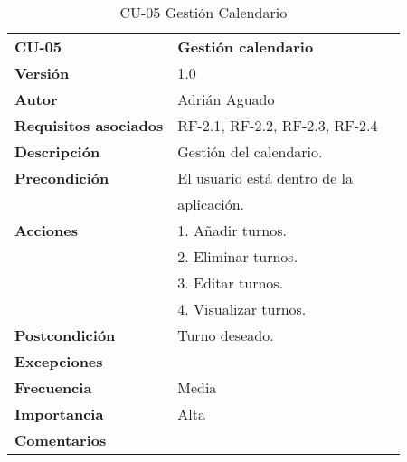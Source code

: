 \begin{table}[H]
\begin{tabular}{llr}  
\toprule
\begin{minipage}[b]{0.24\columnwidth}\raggedright\strut
\textbf{CU-05}\strut
\end{minipage} & \begin{minipage}[b]{0.72\columnwidth}\raggedright\strut
\textbf{Gestión calendario}\strut
\end{minipage}\tabularnewline
\cmidrule(r){1-2}
\textbf{Versión}       & 1.0           \\
\textbf{Autor}       & Adrián  Aguado    \\
\textbf{Requisitos asociados}       & RF-2.1, RF-2.2, RF-2.3, RF-2.4  \\ 
\textbf{Descripción} & Gestión del calendario.\\
\textbf{Precondición} & El usuario está dentro de la \\
& aplicación.       \\
\textbf{Acciones} & 1. Añadir turnos. \\
& 2. Eliminar turnos. \\
& 3. Editar turnos. \\
& 4. Visualizar turnos. \\
\textbf{Postcondición} & Turno deseado. \\
\textbf{Excepciones} &     \\
\textbf{Frecuencia} & Media          \\
\textbf{Importancia} & Alta            \\
\textbf{Comentarios } &      \\
\bottomrule
\end{tabular}
\caption{CU-05 Gestión Calendario} 
\end{table}

